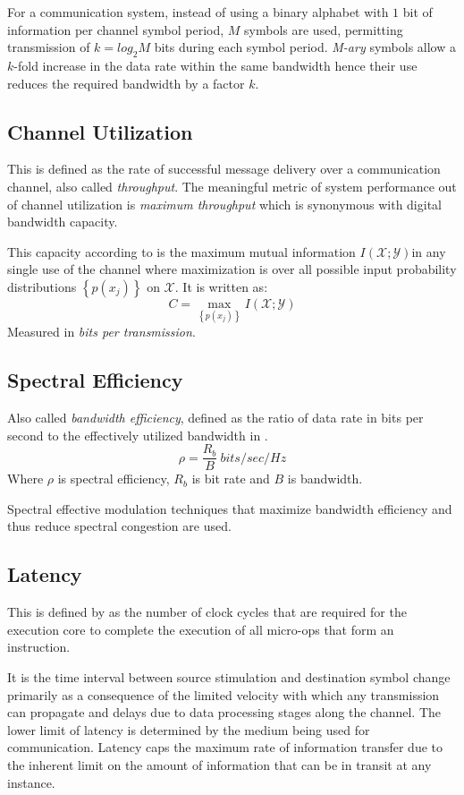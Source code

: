 For a communication system, instead of using a binary alphabet with $1$ bit of information per channel \gls{symbol} period, $M$ \gls{symbol}s are used, permitting transmission of $k=log_{2}M$ bits during each \gls{symbol} period. \textit{M-ary} \gls{symbol}s allow a $k$-fold increase in the data rate within the same bandwidth hence their use reduces the required bandwidth by a factor $k$\cite{AWGN}.

\subsection{Channel Utilization}
This is defined as the rate of successful message delivery over a communication channel, also called \textit{throughput}.
The meaningful metric of system performance out of channel utilization is \textit{maximum throughput} which is synonymous with digital bandwidth capacity.

This capacity according to \cite{hayk} is the maximum mutual information $I\left( \mathscr{X;Y} \right)$in any single use of the channel where maximization is over all possible input probability distributions $\left\{ p\left( x_j\right) \right\}$ on $\mathscr{X}$. It is written as: 
$$C = \underset{\left\{ p\left( x_j\right) \right\}}{\max} I\left( \mathscr{X;Y} \right)$$
Measured in \textit{bits per transmission}.

\subsection{Spectral Efficiency}
Also called \textit{bandwidth efficiency}, defined as the ratio of data rate in bits per second to the effectively utilized bandwidth in \cite{hayk}.
$$\rho = \frac{R_b}{B}\ bits/sec/Hz$$
Where $\rho$ is spectral efficiency, $R_b$ is bit rate and $B$ is bandwidth.

Spectral effective modulation techniques that maximize bandwidth efficiency and thus reduce spectral
congestion are used.\cite{AWGN}

\subsection{Latency}
This is defined by \cite{latintel} as the number of clock cycles that are required for the execution core to complete the execution of all micro-ops that form an instruction.

It is the time interval between source stimulation and destination \gls{symbol} change primarily as a consequence of the limited velocity with which any transmission can propagate and delays due to data processing stages along the channel.
The lower limit of latency is determined by the medium being used for communication. Latency caps the maximum rate of information transfer due to the inherent limit on the amount of information that can be in transit at any instance. 

